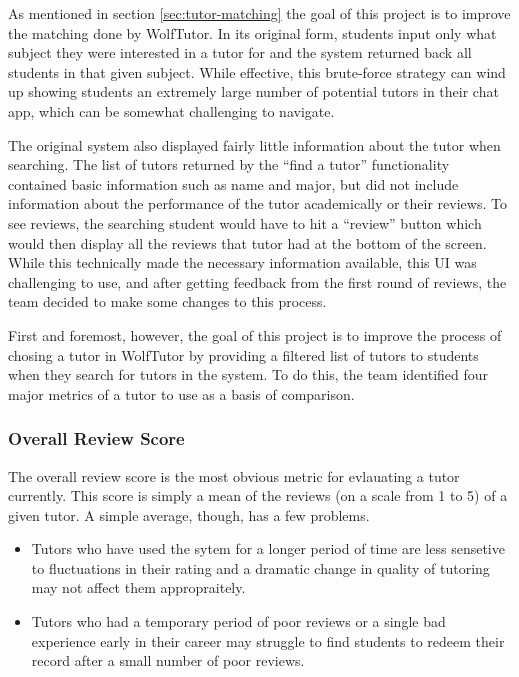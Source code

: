 As mentioned in section \ref{sec:tutor-matching} the goal of this project is to
improve the matching done by WolfTutor.  In its original form, students input
only what subject they were interested in a tutor for and the system returned
back all students in that given subject.  While effective, this brute-force
strategy can wind up showing students an extremely large number of potential
tutors in their chat app, which can be somewhat challenging to navigate.

The original system also displayed fairly little information about the tutor
when searching.  The list of tutors returned by the ``find a tutor''
functionality contained basic information such as name and major, but did not
include information about the performance of the tutor academically or their
reviews.  To see reviews, the searching student would have to hit a ``review''
button which would then display all the reviews that tutor had at the bottom of
the screen. While this technically made the necessary information available,
this UI was challenging to use, and after getting feedback from the first round
of reviews, the team decided to make some changes to this process.  

First and foremost, however, the goal of this project is to improve the process
of chosing a tutor in WolfTutor by providing a filtered list of tutors to
students when they search for tutors in the system.  To do this, the team
identified four major metrics of a tutor to use as a basis of comparison.

\subsubsection{Overall Review Score}
The overall review score is the most obvious metric for evlauating a tutor
currently.  This score is simply a mean of the reviews (on a scale from 1 to
5) of a given tutor.  A simple average, though, has a few problems.
\begin{itemize}
\item Tutors who have used the sytem for a longer period of time are less
  sensetive to fluctuations in their rating and a dramatic change in quality
  of tutoring may not affect them appropraitely.
\item Tutors who had a temporary period of poor reviews or a single bad
  experience early in their career may struggle to find students to redeem
  their record after a small number of poor reviews.  
\end{itemize}

